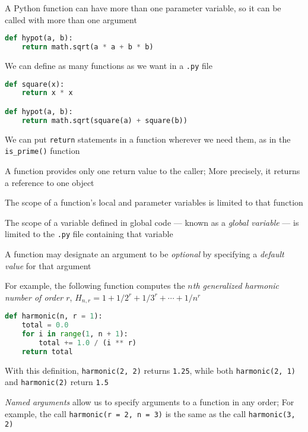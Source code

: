 \documentclass[8pt,a4paper,compress]{beamer}
\begin{document}
\begin{frame}[fragile]
A Python function can have more than one parameter variable, so it can be called with more than one argument
\begin{lstlisting}[language=Python]
def hypot(a, b):
    return math.sqrt(a * a + b * b)
\end{lstlisting}

\bigskip

We can define as many functions as we want in a \lstinline{.py} file
\begin{lstlisting}[language=Python]
def square(x):
    return x * x

def hypot(a, b):
    return math.sqrt(square(a) + square(b))
\end{lstlisting}

\bigskip

We can put \lstinline{return} statements in a function wherever we need them, as in the \lstinline{is_prime()} function

\bigskip

A function provides only one return value to the caller; More precisely, it returns a reference to one object

\bigskip

The scope of a function's local and parameter variables is limited to that function

\bigskip

The scope of a variable defined in global code --- known as a \emph{global variable} --- is limited to the \lstinline{.py} file containing that variable
\end{frame}

\begin{frame}[fragile]
A function may designate an argument to be \emph{optional} by specifying a \emph{default value} for that argument

\bigskip

For example, the following function computes the \emph{$n$th generalized harmonic number of order $r$}, $H_{n,r}=1+1/2^r+1/3^r+\cdots+1/n^r$

\begin{lstlisting}[language=Python]
def harmonic(n, r = 1):
    total = 0.0
    for i in range(1, n + 1):
        total += 1.0 / (i ** r)
    return total
\end{lstlisting}
With this definition, \lstinline{harmonic(2, 2)} returns \lstinline{1.25}, while both \lstinline{harmonic(2, 1)} and \lstinline{harmonic(2)} return \lstinline{1.5}

\bigskip

\emph{Named arguments} allow us to specify arguments to a function in any order; For example, the call \lstinline{harmonic(r = 2, n = 3)} is the same as the call \lstinline{harmonic(3, 2)}
\end{frame}
\end{document}
